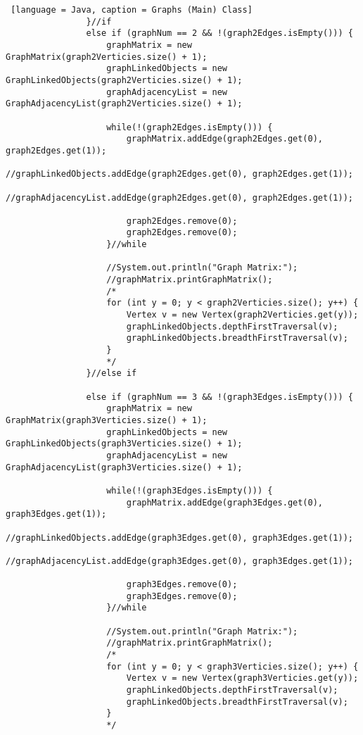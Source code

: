 \documentclass{article}
\begin{document}
\begin{lstlisting} [language = Java, caption = Graphs (Main) Class]
                }//if
                else if (graphNum == 2 && !(graph2Edges.isEmpty())) {
                    graphMatrix = new GraphMatrix(graph2Verticies.size() + 1);
                    graphLinkedObjects = new GraphLinkedObjects(graph2Verticies.size() + 1);
                    graphAdjacencyList = new GraphAdjacencyList(graph2Verticies.size() + 1);

                    while(!(graph2Edges.isEmpty())) {
                        graphMatrix.addEdge(graph2Edges.get(0), graph2Edges.get(1));
                        //graphLinkedObjects.addEdge(graph2Edges.get(0), graph2Edges.get(1));
                        //graphAdjacencyList.addEdge(graph2Edges.get(0), graph2Edges.get(1));

                        graph2Edges.remove(0);
                        graph2Edges.remove(0);
                    }//while

                    //System.out.println("Graph Matrix:");
                    //graphMatrix.printGraphMatrix();
                    /*
                    for (int y = 0; y < graph2Verticies.size(); y++) {
                        Vertex v = new Vertex(graph2Verticies.get(y));
                        graphLinkedObjects.depthFirstTraversal(v);
                        graphLinkedObjects.breadthFirstTraversal(v);
                    }
                    */
                }//else if

                else if (graphNum == 3 && !(graph3Edges.isEmpty())) {
                    graphMatrix = new GraphMatrix(graph3Verticies.size() + 1);
                    graphLinkedObjects = new GraphLinkedObjects(graph3Verticies.size() + 1);
                    graphAdjacencyList = new GraphAdjacencyList(graph3Verticies.size() + 1);

                    while(!(graph3Edges.isEmpty())) {
                        graphMatrix.addEdge(graph3Edges.get(0), graph3Edges.get(1));
                        //graphLinkedObjects.addEdge(graph3Edges.get(0), graph3Edges.get(1));
                        //graphAdjacencyList.addEdge(graph3Edges.get(0), graph3Edges.get(1));

                        graph3Edges.remove(0);
                        graph3Edges.remove(0);
                    }//while

                    //System.out.println("Graph Matrix:");
                    //graphMatrix.printGraphMatrix();
                    /*
                    for (int y = 0; y < graph3Verticies.size(); y++) {
                        Vertex v = new Vertex(graph3Verticies.get(y));
                        graphLinkedObjects.depthFirstTraversal(v);
                        graphLinkedObjects.breadthFirstTraversal(v);
                    }
                    */


\end{lstlisting}
\end{document}
